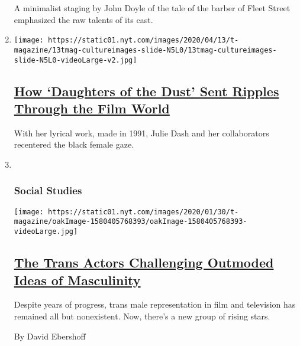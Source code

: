 \begin{enumerate}
  A minimalist staging by John Doyle of the tale of the barber of Fleet
  Street emphasized the raw talents of its cast.
\item
  \texttt{[image: https://static01.nyt.com/images/2020/04/13/t-magazine/13tmag-cultureimages-slide-N5L0/13tmag-cultureimages-slide-N5L0-videoLarge-v2.jpg]}

  \hypertarget{how-daughters-of-the-dust-sent-ripples-through-the-film-world}{%
  \subsection{\texorpdfstring{\href{/interactive/2020/04/13/t-magazine/daughters-of-the-dust.html}{How
  `Daughters of the Dust' Sent Ripples Through the Film
  World}}{How `Daughters of the Dust' Sent Ripples Through the Film World}}\label{how-daughters-of-the-dust-sent-ripples-through-the-film-world}}

  With her lyrical work, made in 1991, Julie Dash and her collaborators
  recentered the black female gaze.
\item ~
  \hypertarget{social-studies}{%
  \subsubsection{Social Studies}\label{social-studies}}

  \texttt{[image: https://static01.nyt.com/images/2020/01/30/t-magazine/oakImage-1580405768393/oakImage-1580405768393-videoLarge.jpg]}

  \hypertarget{the-trans-actors-challenging-outmoded-ideas-of-masculinity}{%
  \subsection{\texorpdfstring{\href{/2020/02/04/t-magazine/trans-actors.html}{The
  Trans Actors Challenging Outmoded Ideas of
  Masculinity}}{The Trans Actors Challenging Outmoded Ideas of Masculinity}}\label{the-trans-actors-challenging-outmoded-ideas-of-masculinity}}

  Despite years of progress, trans male representation in film and
  television has remained all but nonexistent. Now, there's a new group
  of rising stars.

  By David Ebershoff
\end{enumerate}

